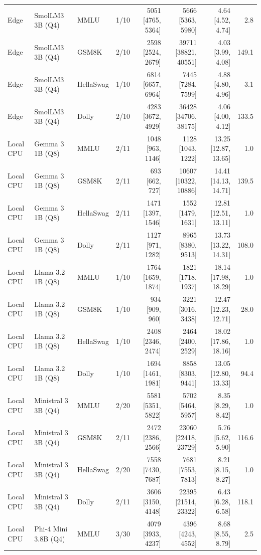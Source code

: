 \begin{longtable}{@{}l l l c r r r r@{}}
Edge & SmolLM3 3B (Q4) & MMLU & 1/10 & 5051 [4765, 5364] & 5666 [5363, 5980] & 4.64 [4.52, 4.74] & 2.8 \\
Edge & SmolLM3 3B (Q4) & GSM8K & 2/10 & 2598 [2524, 2679] & 39711 [38821, 40551] & 4.03 [3.99, 4.08] & 149.1 \\
Edge & SmolLM3 3B (Q4) & HellaSwag & 1/10 & 6814 [6657, 6964] & 7445 [7284, 7599] & 4.88 [4.80, 4.96] & 3.1 \\
Edge & SmolLM3 3B (Q4) & Dolly & 2/10 & 4283 [3672, 4929] & 36428 [34706, 38175] & 4.06 [4.00, 4.12] & 133.5 \\
\midrule
Local CPU & Gemma 3 1B (Q8) & MMLU & 2/11 & 1048 [963, 1146] & 1128 [1043, 1222] & 13.25 [12.87, 13.65] & 1.0 \\
Local CPU & Gemma 3 1B (Q8) & GSM8K & 2/11 & 693 [662, 727] & 10607 [10322, 10886] & 14.41 [14.13, 14.71] & 139.5 \\
Local CPU & Gemma 3 1B (Q8) & HellaSwag & 2/11 & 1471 [1397, 1546] & 1552 [1479, 1631] & 12.81 [12.51, 13.11] & 1.0 \\
Local CPU & Gemma 3 1B (Q8) & Dolly & 2/11 & 1127 [971, 1282] & 8965 [8380, 9513] & 13.73 [13.22, 14.31] & 108.0 \\
Local CPU & Llama 3.2 1B (Q8) & MMLU & 1/10 & 1764 [1659, 1874] & 1821 [1718, 1937] & 18.14 [17.98, 18.29] & 1.0 \\
Local CPU & Llama 3.2 1B (Q8) & GSM8K & 1/10 & 934 [909, 960] & 3221 [3016, 3438] & 12.47 [12.23, 12.71] & 28.0 \\
Local CPU & Llama 3.2 1B (Q8) & HellaSwag & 1/10 & 2408 [2346, 2474] & 2464 [2400, 2529] & 18.02 [17.86, 18.16] & 1.0 \\
Local CPU & Llama 3.2 1B (Q8) & Dolly & 1/10 & 1694 [1461, 1981] & 8858 [8303, 9441] & 13.05 [12.80, 13.33] & 94.4 \\
Local CPU & Ministral 3 3B (Q4) & MMLU & 2/20 & 5581 [5351, 5822] & 5702 [5464, 5957] & 8.35 [8.29, 8.42] & 1.0 \\
Local CPU & Ministral 3 3B (Q4) & GSM8K & 2/11 & 2472 [2386, 2566] & 23060 [22418, 23729] & 5.76 [5.62, 5.90] & 116.6 \\
Local CPU & Ministral 3 3B (Q4) & HellaSwag & 2/20 & 7558 [7430, 7687] & 7681 [7553, 7813] & 8.21 [8.15, 8.27] & 1.0 \\
Local CPU & Ministral 3 3B (Q4) & Dolly & 2/11 & 3606 [3150, 4148] & 22395 [21514, 23322] & 6.43 [6.28, 6.58] & 118.1 \\
Local CPU & Phi-4 Mini 3.8B (Q4) & MMLU & 3/30 & 4079 [3933, 4237] & 4396 [4243, 4552] & 8.68 [8.55, 8.79] & 2.5 \\

\end{longtable}
